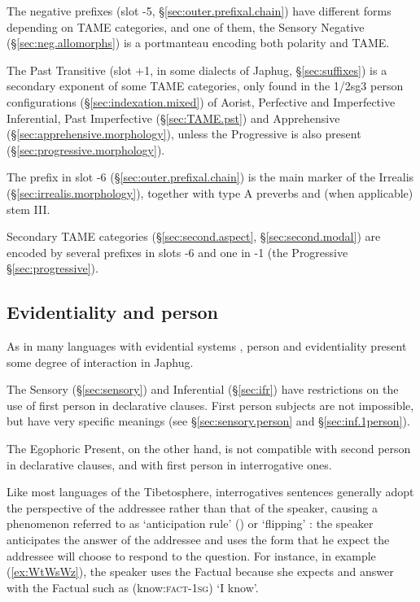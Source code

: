 The negative prefixes (slot -5, §\ref{sec:outer.prefixal.chain}) have different forms depending on TAME categories, and one of them, the Sensory Negative  (§\ref{sec:neg.allomorphs}) is a portmanteau encoding both polarity and TAME.

The Past Transitive  (slot +1,  in some dialects of Japhug, §\ref{sec:suffixes})  is a secondary exponent of some TAME categories, only found in the 1/2sg\fl{}3 person configurations (§\ref{sec:indexation.mixed}) of Aorist, Perfective and Imperfective Inferential, Past Imperfective (§\ref{sec:TAME.pst}) and Apprehensive (§\ref{sec:apprehensive.morphology}), unless the Progressive  is also present (§\ref{sec:progressive.morphology}). 

The prefix  in slot -6 (§\ref{sec:outer.prefixal.chain}) is the main marker of the Irrealis (§\ref{sec:irrealis.morphology}), together with type A preverbs and (when applicable) stem III.

Secondary TAME categories (§\ref{sec:second.aspect}, §\ref{sec:second.modal}) are encoded by several prefixes in slots -6 and one in -1 (the Progressive §\ref{sec:progressive}).

\subsection{Evidentiality and person} \label{sec:anticipation.person}
As in many languages with evidential systems \citep{sun18evidentials}, person and evidentiality present some degree of interaction in Japhug.

The Sensory (§\ref{sec:sensory}) and Inferential (§\ref{sec:ifr}) have restrictions on the use of first person in declarative clauses. First person subjects are not impossible, but have very specific meanings (see §\ref{sec:sensory.person} and §\ref{sec:inf.1person}).

The Egophoric Present, on the other hand, is not compatible with second person in declarative clauses, and with first person in interrogative ones.

Like most languages of the Tibetosphere, interrogatives sentences generally adopt the perspective of the addressee rather than that of the speaker, causing a phenomenon referred to as `anticipation rule' (\citealt[244]{tournadre14evidentiality}) or `flipping' \citep{sanroque17interrogativity}:   the speaker anticipates the answer of the addressee and uses the form that he expect the addressee will choose to respond to the question. For instance, in example (\ref{ex:WtWsWz}), the speaker uses the Factual because she expects and answer with the Factual such as  (know:\textsc{fact}-\textsc{1sg}) `I know'.

